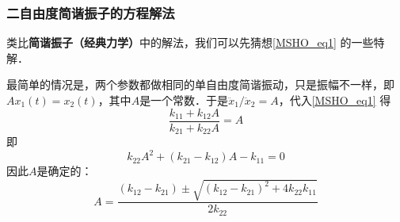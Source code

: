 \subsubsection{二自由度简谐振子的方程解法}

类比\textbf{简谐振子（经典力学）}中的解法，我们可以先猜想\autoref{MSHO_eq1} 的一些特解．

最简单的情况是，两个参数都做相同的单自由度简谐振动，只是振幅不一样，即$Ax_1(t) = x_2(t)$，其中$A$是一个常数．于是${\ddot{x}_1}/{\ddot{x}_2}=A$，代入\autoref{MSHO_eq1} 得
\begin{equation}
\frac{k_{11}+k_{12}A}{k_{21}+k_{22}A}=A
\end{equation}
即
\begin{equation}
k_{22}A^2+(k_{21}-k_{12})A-k_{11} = 0
\end{equation}
因此$A$是确定的：
\begin{equation}
A = \frac{(k_{12}-k_{21})\pm\sqrt{(k_{12}-k_{21})^2 + 4k_{22}k_{11}}}{2k_{22}}
\end{equation}













